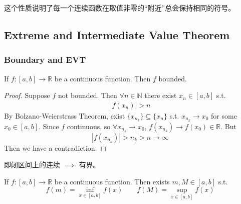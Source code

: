 \documentclass[
	UTF-8,
	11pt, %
	a4paper, %
]{LegrandOrangeBook}
\begin{document}
    \begin{remark}
        这个性质说明了每一个连续函数在取值非零的“附近”总会保持相同的符号。
    \end{remark}


    \newpage

    \subsection{Extreme and Intermediate Value Theorem}

    \subsubsection{Boundary and EVT}

    \begin{theorem}
        If $f : [a,b] \to \mathbb{R}$ be a continuous function. Then $f$ bounded.
    \end{theorem}

    \begin{proof}
        Suppose $f$ not bounded. Then $\forall n \in \mathbb{N}$ 
        there exist $x_n \in [a,b]$ s.t. 
        $$
        \begin{aligned}
            \left| f(x_n) \right| > n
        \end{aligned}
        $$
        By Bolzano-Weierstrass Theorem, 
        exist $\{ x_{n_k} \} \subseteq \{ x_n \}$ s.t. $x_{n_k} \to x_0$ 
        for some $x_0 \in [a,b]$. Since $f$ continuous, 
        so $\forall x_{n_k} \to x_0$, $f(x_{n_k}) \to f(x_0) \in \mathbb{R}$. But 
        $$
            \left| f(x_{n_k}) \right| > n_k > n \to \infty
        $$
        Then we have a contradiction.
    \end{proof}

    \begin{remark}
        即闭区间上的连续 $\implies$ 有界。
    \end{remark}

    \begin{theorem}
        If $f : [a,b] \to \mathbb{R}$ be a continuous function. Then exists $m, M \in [a,b]$ s.t.
        $$
            f(m) = \inf_{x \in [a,b]} f(x) \quad \quad f(M) = \sup_{x \in [a,b]} f(x)
        $$
    \end{theorem}
\end{document}
